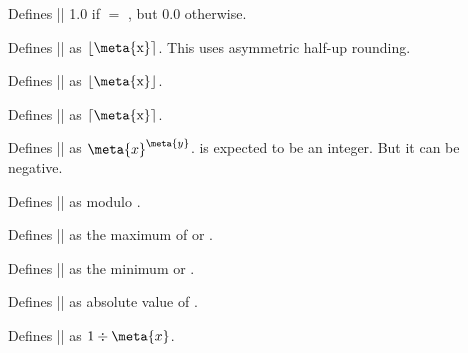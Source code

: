 \begin{command}{\pgfmathequalto{}}       
	Defines |\pgfmathresult| 1.0 if  $=$ , but 0.0 otherwise.                    
\end{command}

\begin{command}{\pgfmathround{}}              
	Defines |\pgfmathresult| as $\left\lfloor\textrm{\meta{x}}\right\rceil$.	
	This uses asymmetric	half-up rounding.                          
\end{command}

\begin{command}{\pgfmathfloor{}}              
	Defines |\pgfmathresult| as $\left\lfloor\textrm{\meta{x}}\right\rfloor$.
\end{command}

\begin{command}{\pgfmathceil{}}               
	Defines |\pgfmathresult| as $\left\lceil\textrm{\meta{x}}\right\rceil$.                           
\end{command}
	
\begin{command}{\pgfmathpow{}}         
	Defines |\pgfmathresult| as $\meta{x}^{\meta{y}}$.  is 
	expected to be an integer. But it can be negative.
\end{command}

\begin{command}{\pgfmathmod{}}           
	Defines |\pgfmathresult| as  modulo .                       
\end{command}

\begin{command}{\pgfmathmax{}}           
	Defines |\pgfmathresult| as the maximum of  or .                       
\end{command}

\begin{command}{\pgfmathmin{}}           
	Defines |\pgfmathresult| as the minimum  or .                       
\end{command}
	
\begin{command}{\pgfmathabs{}}                
	Defines |\pgfmathresult| as  absolute value of .                                 
\end{command}

\begin{command}{\pgfmathreciprocal{}}         
	Defines |\pgfmathresult| as $1\div\meta{x}$.                                  
\end{command}
	
